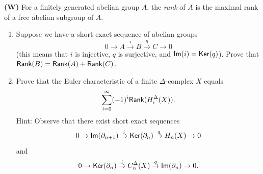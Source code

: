 \begin{problem}
\textbf{(W)} For a finitely generated abelian group $A$, the \emph{rank} of $A$ is the maximal rank of a free abelian subgroup of $A$.
\begin{enumerate}[font=\normalfont,label=\textbf{(\alph*)}]
  \item Suppose we have a short exact sequence of abelian groups
  \[
0 \to A \overset{i}{\to} B \overset{q}{\to} C \to 0
  \]
  (this means that $i$ is injective, $q$ is surjective, and $\mathsf{Im}(i) = \mathsf{Ker}(q)$). Prove that $\mathsf{Rank}(B) = \mathsf{Rank}(A) + \mathsf{Rank}(C)$.

  \item Prove that the Euler characteristic of a finite $\Delta$-complex $X$ equals
  \[
\sum_{i=0}^\infty (-1)^i\mathsf{Rank}(H_i^\Delta (X)).
  \]
  Hint: Observe that there exist short exact sequences
  \[
0 \to \mathsf{Im}(\partial_{n+1}) \overset{i}{\to} \mathsf{Ker}(\partial_n) \overset{q}{\to} H_n(X) \to 0
  \]
  and
  \[
0 \to \mathsf{Ker}(\partial_n) \overset{i}{\to} C_n^\Delta (X) \overset{q}{\to} \mathsf{Im}(\partial_n) \to 0.
  \]
\end{enumerate}
\end{problem}

